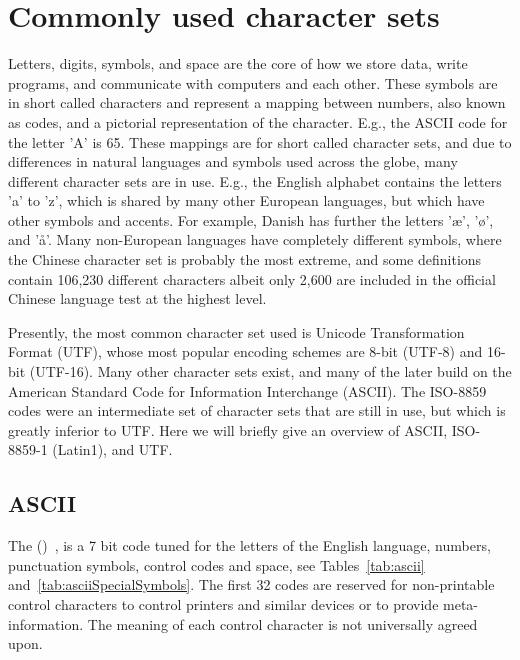 \chapter{Commonly used character sets}
\label{sec:characterSets}
Letters, digits, symbols, and space are the core of how we store data, write programs, and communicate with computers and each other. These symbols are in short called characters and represent a mapping between numbers, also known as codes, and a pictorial representation of the character. E.g., the ASCII code for the letter 'A' is 65. These mappings are for short called character sets, and due to differences in natural languages and symbols used across the globe, many different character sets are in use. E.g., the English alphabet contains the letters 'a' to 'z', which is shared by many other European languages, but which have other symbols and accents. For example, Danish has further the letters 'æ', 'ø', and 'å'. Many non-European languages have completely different symbols, where the Chinese character set is probably the most extreme, and some definitions contain 106,230 different characters albeit only 2,600 are included in the official Chinese language test at the highest level.

Presently, the most common character set used is Unicode Transformation Format (UTF), whose most popular encoding schemes are 8-bit (UTF-8) and 16-bit (UTF-16). Many other character sets exist, and many of the later build on the American Standard Code for Information Interchange (ASCII). The ISO-8859 codes were an intermediate set of character sets that are still in use, but which is greatly inferior to UTF. Here we will briefly give an overview of ASCII, ISO-8859-1 (Latin1), and UTF.

\section{ASCII}
\label{sec:ascii}
The  ()~\cite{ascii63}, is a 7 bit code tuned for the letters of the English language, numbers, punctuation symbols, control codes and space, see Tables~\ref{tab:ascii} and~\ref{tab:asciiSpecialSymbols}. The first 32 codes are reserved for non-printable control characters to control printers and similar devices or to provide meta-information. The meaning of each control character is not universally agreed upon.

